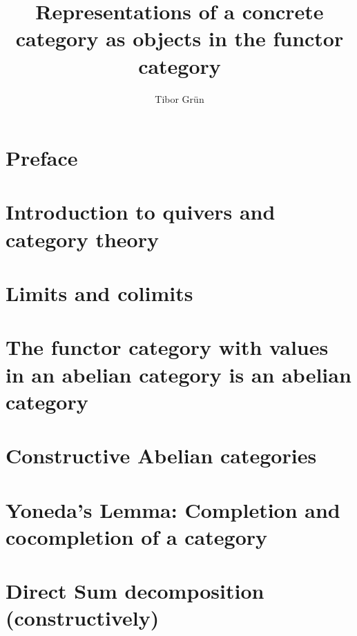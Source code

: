 \documentclass{article}
\title{Representations of a concrete category as objects in the functor category}
\author{Tibor Gr{\"u}n}
\begin{document}

	\maketitle

	\newpage

	\tableofcontents\label{toc}
	
	\newpage

	
\section{Preface}

\section{Introduction to quivers and category theory}


\section{Limits and colimits}


\section{The functor category with values in an abelian category is an abelian category}


\section{Constructive Abelian categories}



\section{Yoneda's Lemma: Completion and cocompletion of a category}


\section{Direct Sum decomposition (constructively)}

\end{document}
